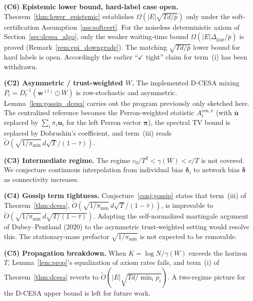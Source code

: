\documentclass[11pt]{article}
\begin{document}
\textbf{(C6) Epistemic lower bound, hard-label case open.}
Theorem~\ref{thm:lower_epistemic} establishes
$\Omega(|E|\sqrt{Td/\bar p})$ only under the soft-certification
Assumption~\ref{ass:softcert}.  For the noiseless deterministic axiom
of Section~\ref{sec:dcesa_algo}, only the weaker waiting-time bound
$\Omega(|E|\Delta_{\mathrm{gap}}/\bar p)$ is proved
(Remark~\ref{rem:epi_downgrade}). The matching $\sqrt{Td/\bar p}$
lower bound for hard labels is open.  Accordingly the earlier
``$\checkmark$ tight'' claim for term~(i) has been withdrawn.

\textbf{(C2) Asymmetric / trust-weighted $W$.}
The implemented D-CESA mixing $P_t=D_t^{-1}(\bm w^{(t)}\odot W)$ is
row-stochastic and asymmetric.  Lemma~\ref{lem:gossip_dcesa} carries out
the program previously only sketched here.  The centralized reference
becomes the Perron-weighted statistic $A_t^{\mathrm{cen},\pi}$ (with
$\bar{\bm u}$ replaced by $\sum_i\pi_i\bm u_i$ for the left Perron vector
$\bm\pi$), the spectral TV bound is replaced by Dobrushin's coefficient,
and term~(iii) reads
$\widetilde O(\sqrt{1/\pi_{\min}}\,d\sqrt T/(1-\bar\tau))$.

\textbf{(C3) Intermediate regime.}
The regime $c_0/T^2<\gamma(W)<c/T$ is not covered. We conjecture
continuous interpolation from individual bias $\bm{\delta}_i$ to
network bias $\bm{\delta}$ as connectivity increases.

\textbf{(C4) Gossip term tightness.}
Conjecture~\ref{conj:gossip} states that term~(iii) of
Theorem~\ref{thm:dcesa},
$\widetilde{O}(\sqrt{1/\pi_{\min}}\,d\sqrt T/(1-\bar\tau))$, is improvable
to $\widetilde{O}(\sqrt{1/\pi_{\min}}\,d\sqrt{T/(1-\bar\tau)})$.
Adapting the self-normalized martingale argument of
Dubey--Pentland (2020) to the asymmetric trust-weighted setting
would resolve this.  The stationary-mass prefactor $\sqrt{1/\pi_{\min}}$
is not expected to be removable.

\textbf{(C5) Propagation breakdown.}
When $K=\log N/\gamma(W)$ exceeds the horizon $T$,
Lemma~\ref{lem:prop}'s equalization of axiom rates fails,
and term~(i) of Theorem~\ref{thm:dcesa} reverts to
$\widetilde{O}(|E|\sqrt{Td/\min_i p_i})$.
A two-regime picture for the D-CESA upper bound is left for
future work.
\end{document}
